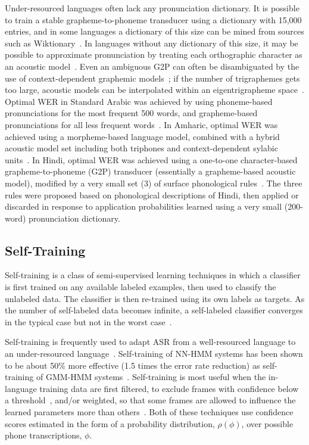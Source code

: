 Under-resourced languages often lack any pronunciation dictionary.  It
is possible to train a stable grapheme-to-phoneme transducer using a
dictionary with 15,000 entries, and in some languages a dictionary of
this size can be mined from sources such as
Wiktionary~\cite{Schlippe2014}.  In languages without any dictionary
of this size, it may be possible to approximate pronunciation by
treating each orthographic character as an acoustic 
model~\cite{Kanthak2002,Charoenpornsawat06,Gizaw2008,Le2009}.
Even an ambiguous G2P can often be disambiguated by the use of
context-dependent graphemic models~\cite{Kanthak2002}; if the number
of trigraphemes gets too large, acoustic models can be interpolated
within an eigentrigrapheme space~\cite{Ko2014}.  Optimal WER in
Standard Arabic was achieved by using phoneme-based pronunciations for
the most frequent 500 words, and grapheme-based pronunciations for all
less frequent words~\cite{Elmahdy2012}.  In Amharic, optimal WER was
achieved using a morpheme-based language model, combined with a hybrid
acoustic model set including both triphones and context-dependent
sylabic units~\cite{Tachbelie2014}.  In Hindi, optimal WER was
achieved using a one-to-one character-based grapheme-to-phoneme (G2P)
transducer (essentially a grapheme-based acoustic model), modified by
a very small set (3) of surface phonological
rules~\cite{Jyothi2015interspeech_hindi}.  The three rules were
proposed based on phonological descriptions of Hindi, then applied or
discarded in response to application probabilities learned using a
very small (200-word) pronunciation dictionary.

\subsection{Self-Training}

Self-training is a class of semi-supervised learning techniques in
which a classifier is first trained on any available labeled examples,
then used to classify the unlabeled data.  The classifier is then
re-trained using its own labels as targets.  As the number of
self-labeled data becomes infinite, a self-labeled classifier
converges in the typical case but not in the worst
case~\cite{Scudder1965}.  

Self-training is frequently used to adapt ASR from a well-resourced
language to an under-resourced language~\cite{Loof2009,Cetin2008}.
Self-training of NN-HMM systems has been shown to be about 50\% more
effective (1.5 times the error rate reduction) as self-training of
GMM-HMM systems~\cite{Huang2013b}.  Self-training is most useful when
the in-language training data are first filtered, to exclude frames
with confidence below a threshold~\cite{vesely2013-semi,Vu2011b},
and/or weighted, so that some frames are allowed to influence the
learned parameters more than others~\cite{Hsiao2013}.  Both of these
techniques use confidence scores estimated in the form of a
probability distribution, $\rho(\phi)$, over possible phone
transcriptions, $\phi$.

